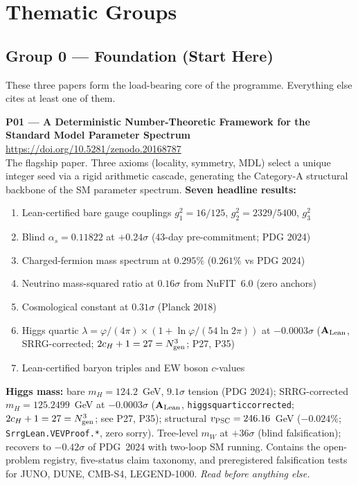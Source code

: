 \documentclass[11pt]{article}
\newcommand{\lean}[1]{%
  \penalty-100
  \begingroup\def\_{{\textunderscore\allowbreak}}\texttt{#1}\endgroup}
\newcommand{\CatAL}{\ensuremath{\textbf{A}_{\rm Lean}}}
\begin{document}
\section{Thematic Groups}
\label{sec:groups}

\subsection{Group 0 — Foundation (Start Here)}

These three papers form the load-bearing core of the programme.
Everything else cites at least one of them.

\medskip
\noindent\textbf{P01 — A Deterministic Number-Theoretic Framework for the
Standard Model Parameter Spectrum}~\cite{Spivack2026_SM_UGP}\\
\url{https://doi.org/10.5281/zenodo.20168787}\\
The flagship paper.  Three axioms (locality, symmetry, MDL) select a unique
integer seed via a rigid arithmetic cascade, generating the Category-A
structural backbone of the SM parameter spectrum.
\textbf{Seven headline results:}
\begin{enumerate}[noitemsep,topsep=2pt]
\item Lean-certified bare gauge couplings $g_1^2 = 16/125$, $g_2^2 = 2329/5400$, $g_3^2$
\item Blind $\alpha_s = 0.11822$ at $+0.24\sigma$ (43-day pre-commitment; PDG 2024)
\item Charged-fermion mass spectrum at $0.295\%$ ($0.261\%$ vs PDG 2024)
\item Neutrino mass-squared ratio at $0.16\sigma$ from NuFIT~6.0 (zero anchors)
\item Cosmological constant at $0.31\sigma$ (Planck 2018)
\item Higgs quartic $\lambda = \varphi/(4\pi)\times(1+\ln\varphi/(54\ln 2\pi))$ at
  $-0.0003\sigma$ (\CatAL, SRRG-corrected; $2c_H+1=27=N_{\rm gen}^3$; P27, P35)
\item Lean-certified baryon triples and EW boson $c$-values
\end{enumerate}
\textbf{Higgs mass:} bare $m_H = 124.2$~GeV, $9.1\sigma$ tension (PDG 2024);
SRRG-corrected $m_H = 125.2499$~GeV at $-0.0003\sigma$ (\CatAL,
\lean{higgs\_quartic\_corrected}; $2c_H+1 = 27 = N_{\rm gen}^3$; see P27, P35);
structural $v_{\rm PSC} = 246.16$~GeV ($-0.024\%$; \texttt{SrrgLean.VEVProof.*}, zero sorry).
Tree-level $m_W$ at $+36\sigma$ (blind falsification); recovers to $-0.42\sigma$ of
PDG~2024 with two-loop SM running.
Contains the open-problem registry, five-status claim taxonomy, and preregistered
falsification tests for JUNO, DUNE, CMB-S4, LEGEND-1000. \emph{Read before anything else.}
\end{document}
